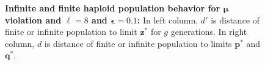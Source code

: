 \begin{figure}[!b]
\begin{center}
\hspace{-3em}%
\vspace{-0.5em} \hspace{-3em}%

\caption[\textbf{Infinite and finite haploid population behavior for $\bm{\mu}$ violation, genome length $\ell = 8$ and $\bm{\epsilon} = 0.1$}]
{\textbf{Infinite and finite haploid population behavior for $\bm{\mu}$ violation and $\ell = 8$ and $\bm{\epsilon} = 0.1$:} 
  In left column, $d'$ is distance of finite or infinite population to limit $\bm{z}^\ast$ for $g$ generations. 
  In right column, $d$ is distance of finite or infinite population to limits $\bm{p}^\ast$ and $\bm{q}^\ast$.}
\label{oscillation_8h_vio_mu_0.1}
\end{center}
\end{figure}

